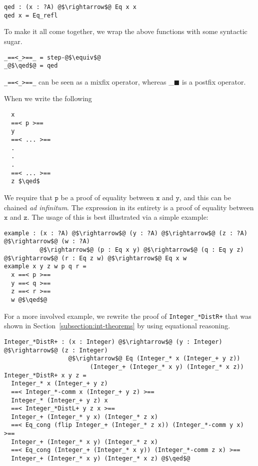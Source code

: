 \documentclass[12pt,twoside,maitrise]{dms}
\theoremstyle{definition}
\numberwithin{equation}{section}
\numberwithin{table}{chapter}
\numberwithin{figure}{chapter}
\newcommand\id[1] {\texttt{#1}}
\newcommand\latinphrase{\textit}
\renewcommand\qed{\blacksquare}
\begin{document}
\begin{verbatim}
qed : (x : ?A) @$\rightarrow$@ Eq x x
qed x = Eq_refl
\end{verbatim}

To make it all come together, we wrap the above functions with some syntactic
sugar.

\begin{verbatim}
_==<_>==_ = step-@$\equiv$@
_@$\qed$@ = qed
\end{verbatim}

\verb|_==<_>==_| can be seen as a mixfix operator, whereas \_$\qed$ is a postfix
operator.

When we write the following

\begin{lstlisting}
  x
  ==< p >==
  y
  ==< ... >==
  .
  .
  .
  ==< ... >==
  z $\qed$
\end{lstlisting}

We require that $\id{p}$ be a proof of equality between $\id{x}$ and $\id{y}$, and this can be chained \latinphrase{ad infinitum}. The expression in its entirety is a proof of equality between $\id{x}$ and $\id{z}$. The usage of this is best illustrated via a simple example:

\begin{verbatim}
example : (x : ?A) @$\rightarrow$@ (y : ?A) @$\rightarrow$@ (z : ?A) @$\rightarrow$@ (w : ?A)
          @$\rightarrow$@ (p : Eq x y) @$\rightarrow$@ (q : Eq y z) @$\rightarrow$@ (r : Eq z w) @$\rightarrow$@ Eq x w
example x y z w p q r =
  x ==< p >==
  y ==< q >==
  z ==< r >==
  w @$\qed$@
\end{verbatim}

For a more involved example, we rewrite the proof of \verb|Integer_*DistR+| that was shown in Section~\ref{subsection:int-theorems} by using equational reasoning.

\begin{verbatim}
Integer_*DistR+ : (x : Integer) @$\rightarrow$@ (y : Integer) @$\rightarrow$@ (z : Integer)
                  @$\rightarrow$@ Eq (Integer_* x (Integer_+ y z))
                        (Integer_+ (Integer_* x y) (Integer_* x z))
Integer_*DistR+ x y z =
  Integer_* x (Integer_+ y z)
  ==< Integer_*-comm x (Integer_+ y z) >==
  Integer_* (Integer_+ y z) x
  ==< Integer_*DistL+ y z x >==
  Integer_+ (Integer_* y x) (Integer_* z x)
  ==< Eq_cong (flip Integer_+ (Integer_* z x)) (Integer_*-comm y x) >==
  Integer_+ (Integer_* x y) (Integer_* z x)
  ==< Eq_cong (Integer_+ (Integer_* x y)) (Integer_*-comm z x) >==
  Integer_+ (Integer_* x y) (Integer_* x z) @$\qed$@
\end{verbatim}
\end{document}
